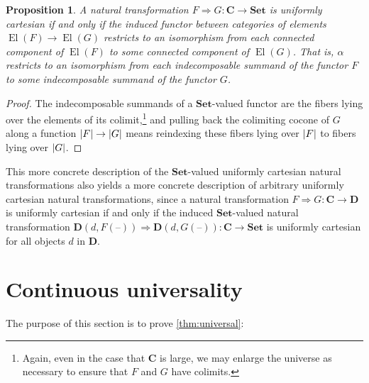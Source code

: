 \documentclass[11pt, oneside, article]{memoir}
\makeatletter
\theoremstyle{plain}
\newtheorem{proposition}[theorem]{Proposition}
\theoremstyle{definition}
\theoremstyle{remark}
\def\theHsection{\theHchapter.\arabic{section}}
\def\theHtheorem{\theHsection.\arabic{theorem}}
\def\theHcorollary{\theHsection.\arabic{theorem}}
\def\theHproposition{\theHsection.\arabic{theorem}}
\def\theHlemma{\theHsection.\arabic{theorem}}
\def\theHconjecture{\theHsection.\arabic{theorem}}
\def\theHdefinition{\theHsection.\arabic{theorem}}
\def\theHmyremark{\theHsection.\arabic{theorem}}
\def\theHmyexample{\theHsection.\arabic{theorem}}
\def\theHmyconvention{\theHsection.\arabic{theorem}}
\def\theHmywarning{\theHsection.\arabic{theorem}}
\def\theHmycounterexample{\theHsection.\arabic{theorem}}
\def\theHdef{\theHsection.\arabic{theorem}}
\def\theHrem{\theHsection.\arabic{theorem}}
\let\@origchapter\chapter
\renewcommand{\thechapter}{\arabic{chapter}}
\newif\if@inappendixmode
\newcommand{\@syncthmdisplay}{%
  \global\let\thedef\thetheorem
  \global\let\therem\thetheorem
  \global\let\thedefinition\thetheorem
  \global\let\thelemma\thetheorem
  \global\let\thecorollary\thetheorem
  \global\let\theproposition\thetheorem
  \global\let\theconjecture\thetheorem
  \global\let\themyremark\thetheorem
  \global\let\themyexample\thetheorem
  \global\let\themyconvention\thetheorem
  \global\let\themywarning\thetheorem
  \global\let\themycounterexample\thetheorem
}
\newcommand{\@syncthmH}[1]{%
  \gdef\theHtheorem{#1}\gdef\theHcorollary{#1}\gdef\theHproposition{#1}%
  \gdef\theHlemma{#1}\gdef\theHconjecture{#1}\gdef\theHdefinition{#1}%
  \gdef\theHmyremark{#1}\gdef\theHmyexample{#1}\gdef\theHmyconvention{#1}%
  \gdef\theHmywarning{#1}\gdef\theHmycounterexample{#1}%
  \gdef\theHdef{#1}\gdef\theHrem{#1}%
}
\renewcommand{\chapter}{%
  \if@inappendixmode%
    \renewcommand{\thechapter}{\Alph{chapter}}%
    \renewcommand{\theHchapter}{\Alph{chapter}}%
    \counterwithout*{theorem}{section}%
    \gdef\thetheorem{\thechapter.\arabic{theorem}}%
    \@syncthmdisplay
    \@syncthmH{\theHchapter.\arabic{theorem}}%
  \else
    \renewcommand{\thechapter}{\arabic{chapter}}%
    \renewcommand{\theHchapter}{\arabic{chapter}}%
  \fi
  \@origchapter
}
\DeclareMathOperator{\El}{El}
\DeclarePairedDelimiter{\abs}{\lvert}{\rvert}
\newcommand{\dash}{{\mathord{\text{--}}}}
\newcommand{\namedcat}[1]{\mathbf{#1}}
\newcommand{\cat}[1]{\mathbf{#1}}
\newcommand{\Set}{\namedcat{Set}}
\newcommand{\pts}[1]{{\abs{#1}}}
\newcommand{\Ho}[1]{#1}
\newcommand{\bC}{\cat{C}}
\newcommand{\bD}{\cat{D}}
\makeatother
\begin{document}
\begin{proposition}\label{prop:stronguniform}
  A natural transformation $F \Rightarrow G \colon \bC \to \Set$ is
  uniformly cartesian if and only if the induced functor between
  categories of elements $\El(F) \to \El(G)$ restricts to an
  isomorphism from each connected component of $\El(F)$ to some
  connected component of $\El(G)$. That is, $\alpha$ restricts to an
  isomorphism from each indecomposable summand of the functor $F$ to
  some indecomposable summand of the functor $G$.
\end{proposition}
\begin{proof}
  The indecomposable summands of a $\Set$-valued functor are the
  fibers lying over the elements of its colimit,\footnote{Again, even
    in the case that $\bC$ is large, we may enlarge the universe as
    necessary to ensure that $F$ and $G$ have colimits.} and pulling
  back the colimiting cocone of $G$ along a function
  $\pts{F} \to \pts{G}$ means reindexing these fibers lying over
  $\pts{F}$ to fibers lying over $\pts{G}$.
\end{proof}

This more concrete description of the $\Set$-valued uniformly
cartesian natural transformations also yields a more concrete
description of arbitrary uniformly cartesian natural transformations,
since a natural transformation $F \Rightarrow G \colon \bC \to \bD$ is
uniformly cartesian if and only if the induced $\Set$-valued natural
transformation
$\Ho{\bD}(d, F(\dash)) \Rightarrow \Ho{\bD}(d, G(\dash)) \colon \bC \to \Set$
is uniformly cartesian for all objects $d$ in $\bD$.

\chapter{Continuous universality}\label{app:universal}
\appendixtocspace

The purpose of this section is to prove \cref{thm:universal}:

\thmuniversal*
\end{document}
